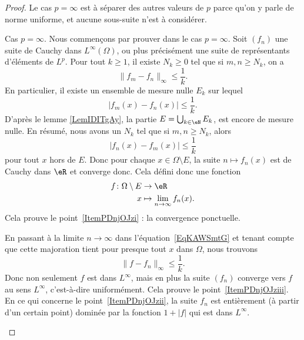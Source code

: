 \begin{proof}
	Le cas \( p=\infty\) est à séparer des autres valeurs de \( p\) parce qu'on y parle de norme uniforme, et aucune sous-suite n'est à considérer.
	\begin{subproof}
		\item[Cas \( p=\infty\).]
		Nous commençons par prouver dans le cas \( p=\infty\). Soit \( (f_n)\) une suite de Cauchy dans \( L^{\infty}(\Omega)\), ou plus précisément une suite de représentants d'éléments de \( L^p\). Pour tout \( k\geq 1\), il existe \( N_k\geq 0\) tel que si \( m,n\geq N_k\), on a
		\begin{equation}
			\| f_m-f_n \|_{\infty}\leq \frac{1}{ k }.
		\end{equation}
		En particulier, il existe un ensemble de mesure nulle \( E_k\) sur lequel
		\begin{equation}
			| f_m(x)-f_n(x) |\leq\frac{1}{ k }.
		\end{equation}
		D'après le lemme \ref{LemIDITgAy}, la partie \( E=\bigcup_{k\in \eN}E_k\), est encore de mesure nulle. En  résumé, nous avons un \( N_k\) tel que si \( m,n\geq N_k\), alors
		\begin{equation}    \label{EqKAWSmtG}
			| f_n(x)-f_m(x) |\leq \frac{1}{ k }
		\end{equation}
		pour tout \( x\) hors de \( E\). Donc pour chaque \( x\in\Omega\setminus E\), la suite \( n\mapsto f_n(x)\) est de Cauchy dans \( \eR\) et converge donc. Cela défini donc une fonction
		\begin{equation}
			\begin{aligned}
				f\colon \Omega\setminus E & \to \eR                            \\
				x                         & \mapsto \lim_{n\to \infty} f_n(x).
			\end{aligned}
		\end{equation}
		Cela prouve le point~\ref{ItemPDnjOJzi} : la convergence ponctuelle.

		En passant à la limite \( n\to \infty\) dans l'équation~\eqref{EqKAWSmtG} et tenant compte que cette majoration tient pour presque tout \( x\) dans \( \Omega\), nous trouvons
		\begin{equation}
			\| f-f_n \|_{\infty}\leq \frac{1}{ k }.
		\end{equation}
		Donc non seulement \( f\) est dans \( L^{\infty}\), mais en plus la suite \( (f_n)\) converge vers \( f\) au sens \( L^{\infty}\), c'est-à-dire uniformément. Cela prouve le point~\ref{ItemPDnjOJziii}. En ce qui concerne le point~\ref{ItemPDnjOJzii}, la suite \( f_n\) est entièrement (à partir d'un certain point) dominée par la fonction \( 1+| f |\) qui est dans \( L^{\infty}\).


\end{subproof}
\end{proof}
